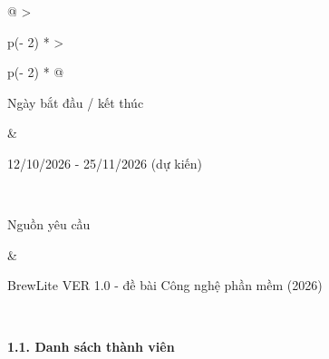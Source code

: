 \documentclass[11pt,a4paper,oneside]{report}
\begin{document}
\begin{longtable}[]{@{}
  >{\raggedright\arraybackslash}p{(\columnwidth - 2\tabcolsep) * }
  >{\raggedright\arraybackslash}p{(\columnwidth - 2\tabcolsep) * }@{}}
\begin{minipage}[b]{\linewidth}
Ngày bắt đầu / kết thúc
\end{minipage} & \begin{minipage}[b]{\linewidth}\raggedright
12/10/2026 - 25/11/2026 (dự kiến)
\end{minipage} \\
\begin{minipage}[b]{\linewidth}\raggedright
Nguồn yêu cầu
\end{minipage} & \begin{minipage}[b]{\linewidth}\raggedright
BrewLite VER 1.0 - đề bài Công nghệ phần mềm (2026)
\end{minipage} \\
\midrule\noalign{}
\endhead
\bottomrule\noalign{}
\endlastfoot
\end{longtable}

\textbf{1.1. Danh sách thành viên}
\end{document}
